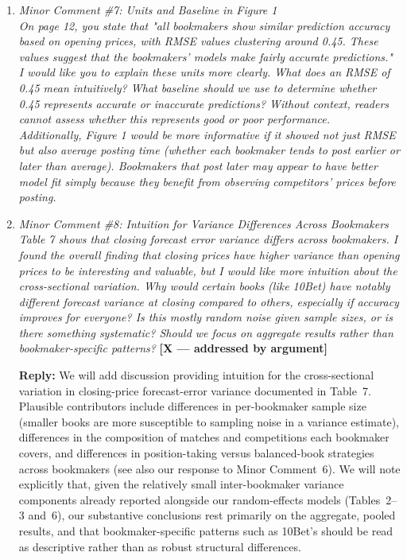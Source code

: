 \documentclass[letterpaper,12pt]{article}
\newcounter{b}
\newcommand{\argX}{\textcolor{green!55!black}{\textbf{[X --- addressed by argument]}}}
\newcommand{\Reply}[1]{\par\noindent\textbf{Reply:} #1}
\begin{document}
\begin{enumerate}
\item \textit{Minor Comment \#7: Units and Baseline in Figure 1\\[6pt]
On page 12, you state that "all bookmakers show similar prediction accuracy based on opening prices, with RMSE values clustering around 0.45. These values suggest that the bookmakers' models make fairly accurate predictions."\\[6pt]
I would like you to explain these units more clearly. What does an RMSE of 0.45 mean intuitively? What baseline should we use to determine whether 0.45 represents accurate or inaccurate predictions? Without context, readers cannot assess whether this represents good or poor performance.\\[6pt]
Additionally, Figure 1 would be more informative if it showed not just RMSE but also average posting time (whether each bookmaker tends to post earlier or later than average). Bookmakers that post later may appear to have better model fit simply because they benefit from observing competitors' prices before posting.}

\item \textit{Minor Comment \#8: Intuition for Variance Differences Across Bookmakers\\[6pt]
Table 7 shows that closing forecast error variance differs across bookmakers. I found the overall finding that closing prices have higher variance than opening prices to be interesting and valuable, but I would like more intuition about the cross-sectional variation. Why would certain books (like 10Bet) have notably different forecast variance at closing compared to others, especially if accuracy improves for everyone? Is this mostly random noise given sample sizes, or is there something systematic? Should we focus on aggregate results rather than bookmaker-specific patterns?} \argX

\Reply{We will add discussion providing intuition for the cross-sectional variation in closing-price forecast-error variance documented in Table~7. Plausible contributors include differences in per-bookmaker sample size (smaller books are more susceptible to sampling noise in a variance estimate), differences in the composition of matches and competitions each bookmaker covers, and differences in position-taking versus balanced-book strategies across bookmakers (see also our response to Minor Comment~6). We will note explicitly that, given the relatively small inter-bookmaker variance components already reported alongside our random-effects models (Tables~2--3 and~6), our substantive conclusions rest primarily on the aggregate, pooled results, and that bookmaker-specific patterns such as 10Bet's should be read as descriptive rather than as robust structural differences.}


\end{enumerate}
\end{document}
